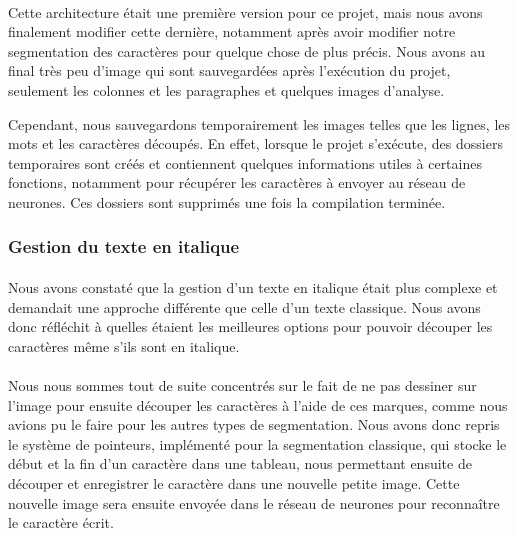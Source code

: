 \documentclass{article}
\begin{document}
    \paragraph{}Cette architecture était une première version pour ce projet, mais nous avons finalement modifier cette dernière, notamment après avoir modifier notre segmentation des caractères pour quelque chose de plus précis. Nous avons au final très peu d'image qui sont sauvegardées après l'exécution du projet, seulement les colonnes et les paragraphes et quelques images d'analyse. \\
    \par Cependant, nous sauvegardons temporairement les images telles que les lignes, les mots et les caractères découpés. En effet, lorsque le projet s'exécute, des dossiers temporaires sont créés et contiennent quelques informations utiles à certaines fonctions, notamment pour récupérer les caractères à envoyer au réseau de neurones. Ces dossiers sont supprimés une fois la compilation terminée.
    
    \subsubsection{Gestion du texte en italique}
    \paragraph{}
    Nous avons constaté que la gestion d'un texte en italique était plus complexe et demandait une approche différente que celle d'un texte classique. Nous avons donc réfléchit à quelles étaient les meilleures options pour pouvoir découper les caractères même s'ils sont en italique.

    \paragraph{}
    Nous nous sommes tout de suite concentrés sur le fait de ne pas dessiner sur l'image pour ensuite découper les caractères à l'aide de ces marques, comme nous avions pu le faire pour les autres types de segmentation. Nous avons donc repris le système de pointeurs, implémenté pour la segmentation classique, qui stocke le début et la fin d'un caractère dans une tableau, nous permettant ensuite de découper et enregistrer le caractère dans une nouvelle petite image. Cette nouvelle image sera ensuite envoyée dans le réseau de neurones pour reconnaître le caractère écrit.
\end{document}
